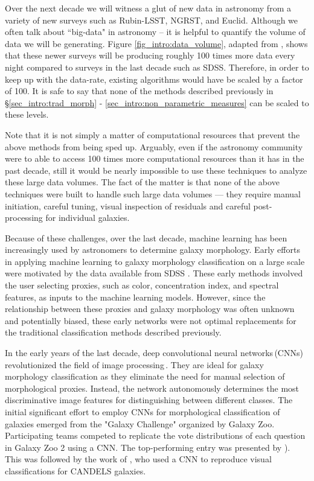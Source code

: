 Over the next decade we will witness a glut of new data in astronomy from a variety of new surveys such as Rubin-LSST, NGRST, and Euclid. Although we often talk about ``big-data" in astronomy -- it is helpful to quantify the volume of data we will be generating. Figure \ref{fig_intro:data_volume}, adapted from \citet{kremer_17}, shows that these newer surveys will be producing roughly 100 times more data every night compared to surveys in the last decade such as SDSS. Therefore, in order to keep up with the data-rate, existing algorithms would have be scaled by a factor of 100. It is safe to say that none of the methods described previously in \S \ref{sec_intro:trad_morph} - \ref{sec_intro:non_parametric_measures} can be scaled to these levels. 

Note that it is not simply a matter of computational resources that prevent the above methods from being sped up. Arguably, even if the astronomy community were to able to access 100 times more computational resources than it has in the past decade, still it would be nearly impossible to use these techniques to analyze these large data volumes. The fact of the matter is that none of the above techniques were built to handle such large data volumes --- they require manual initiation, careful tuning, visual inspection of residuals and careful post-processing for individual galaxies. 

Because of these challenges, over the last decade, machine learning has been increasingly used by astronomers to determine galaxy morphology. Early efforts in applying machine learning to galaxy morphology classification on a large scale were motivated by the data available from SDSS \citep[e.g.,][]{Ball2004GalaxyNetworks,Kelly2004MorphologicalSurvey,banerji_10}. These early methods involved the user selecting proxies, such as color, concentration index, and spectral features, as inputs to the machine learning models. However, since the relationship between these proxies and galaxy morphology was often unknown and potentially biased, these early networks were not optimal replacements for the traditional classification methods described previously. 

In the early years of the last decade, deep  convolutional neural networks\,(CNNs) revolutionized the field of image processing\,\citep[see][for an overview]{dl_1}. They are ideal for galaxy morphology classification as they eliminate the need for manual selection of morphological proxies. Instead, the network autonomously determines the most discriminative image features for distinguishing between different classes. The initial significant effort to employ CNNs for morphological classification of galaxies emerged from the "Galaxy Challenge" organized by Galaxy Zoo. Participating teams competed to replicate the vote distributions of each question in Galaxy Zoo 2 using a CNN. The top-performing entry was presented by \citealp{Dieleman2015Rotation-invariantPrediction}). This was followed by the work of \citet{Huertas-Company2015ALEARNING}, who used a CNN to reproduce visual classifications for CANDELS galaxies.

